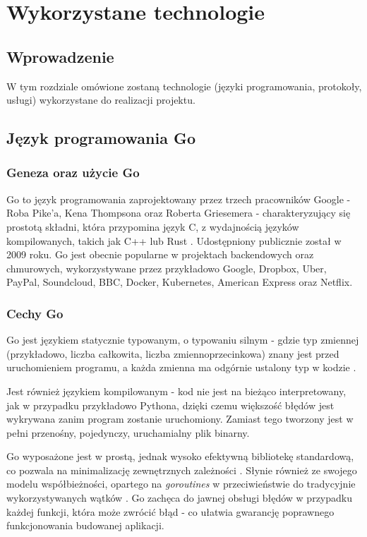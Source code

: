 \chapter{Wykorzystane technologie}
\section{Wprowadzenie}
W tym rozdziale omówione zostaną technologie (języki programowania, protokoły, usługi) wykorzystane do realizacji projektu.

\section{Język programowania Go}
\subsection{Geneza oraz użycie Go}
Go to język programowania zaprojektowany przez trzech pracowników Google - Roba Pike'a, Kena Thompsona oraz Roberta Griesemera - charakteryzujący się prostotą składni, która przypomina język C, z wydajnością języków kompilowanych, takich jak C++ lub Rust \parencite{go_faq}. Udostępniony publicznie został w 2009 roku. Go jest obecnie popularne w projektach backendowych oraz chmurowych, wykorzystywane przez przykładowo Google, Dropbox, Uber, PayPal, Soundcloud, BBC, Docker, Kubernetes, American Express oraz Netflix. 

\subsection{Cechy Go}
Go jest językiem statycznie typowanym, o typowaniu silnym - gdzie typ zmiennej (przykładowo, liczba całkowita, liczba zmiennoprzecinkowa) znany jest przed uruchomieniem programu, a każda zmienna ma odgórnie ustalony typ w kodzie \parencite{golang_specification}. 

Jest również językiem kompilowanym - kod nie jest na bieżąco interpretowany, jak w przypadku przykładowo Pythona, dzięki czemu większość błędów jest wykrywana zanim program zostanie uruchomiony. Zamiast tego tworzony jest w pełni przenośny, pojedynczy, uruchamialny plik binarny.

Go wyposażone jest w prostą, jednak wysoko efektywną bibliotekę standardową, co pozwala na minimalizację zewnętrznych zależności \parencite{golang_stdlib}. Słynie również ze swojego modelu współbieżności, opartego na \textit{goroutines} w przeciwieństwie do tradycyjnie wykorzystywanych wątków \parencite{go_faq}. Go zachęca do jawnej obsługi błędów w przypadku każdej funkcji, która może zwrócić błąd - co ułatwia gwarancję poprawnego funkcjonowania budowanej aplikacji.


